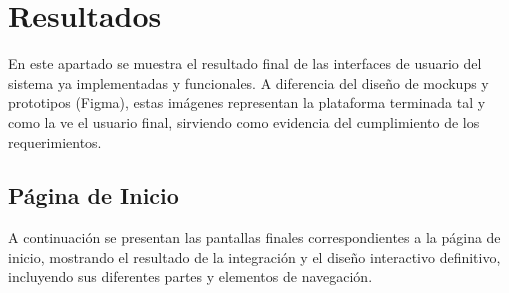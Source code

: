 \section{Resultados}

En este apartado se muestra el resultado final de las interfaces de usuario del sistema ya implementadas y funcionales. A diferencia del diseño de mockups y prototipos (Figma), estas imágenes representan la plataforma terminada tal y como la ve el usuario final, sirviendo como evidencia del cumplimiento de los requerimientos.

\label{sec:pantallas_finales}

\subsection{Página de Inicio}

A continuación se presentan las pantallas finales correspondientes a la página de inicio, mostrando el resultado de la integración y el diseño interactivo definitivo, incluyendo sus diferentes partes y elementos de navegación.


